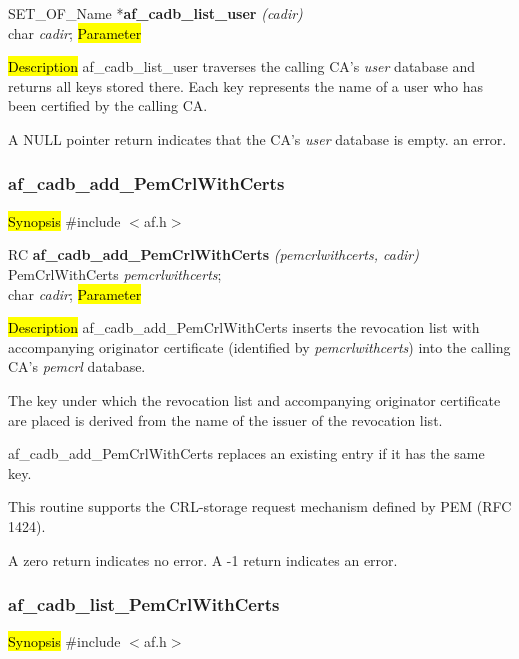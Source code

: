 SET\_OF\_Name *{\bf af\_cadb\_list\_user} {\em (cadir)} \\
char {\em *cadir};
\hl{Parameter}

\hl{Description}
af\_cadb\_list\_user traverses the calling CA's {\em user} database and returns all keys
stored there. Each key represents the name of a user who has been certified by the
calling CA.

A NULL pointer return indicates
\bi
\m that the CA's {\em user} database is empty.
\m an error.
\ei




\subsubsection{af\_cadb\_add\_PemCrlWithCerts}
\label{af_cadb_add_PemCrlWithCerts}
\hl{Synopsis}
\#include $<$af.h$>$

RC {\bf af\_cadb\_add\_PemCrlWithCerts} {\em (pemcrlwithcerts, cadir)} \\
PemCrlWithCerts	{\em *pemcrlwithcerts}; \\
char		{\em *cadir};
\hl{Parameter}


\hl{Description}
af\_cadb\_add\_PemCrlWithCerts inserts the revocation list with accompanying originator certificate
(identified by {\em pemcrlwithcerts}) into the calling CA's {\em pemcrl} database. 

The key under which the revocation list and accompanying originator certificate are placed is derived 
from the name of the issuer of the revocation list.

af\_cadb\_add\_PemCrlWithCerts replaces an existing entry if it has the same key.

This routine supports the CRL-storage request mechanism defined by PEM (RFC 1424).

A  zero return indicates no error.
A -1 return indicates an error.




\subsubsection{af\_cadb\_list\_PemCrlWithCerts}
\label{af_cadb_list_PemCrlWithCerts}
\hl{Synopsis}
\#include $<$af.h$>$

